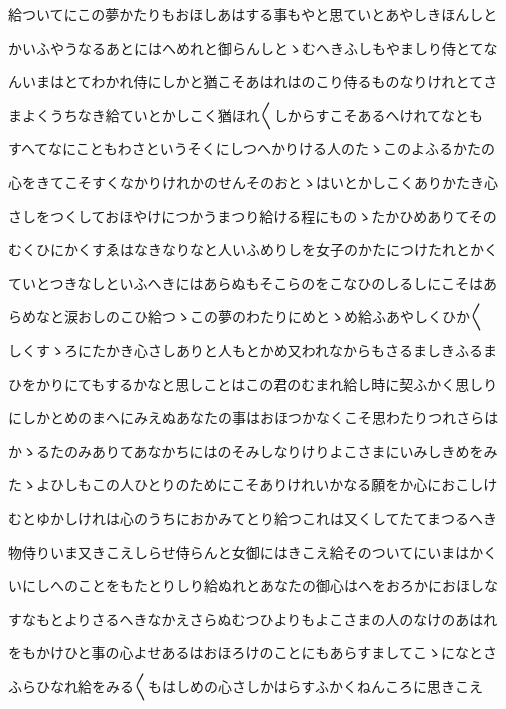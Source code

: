 \documentclass[a4paper,11pt,landscape]{ltjtarticle}
\begin{document}
\par\medskip
給ついてにこの夢かたりもおほしあはする事もやと思ていとあやしきほんしと
\par\medskip
かいふやうなるあとにはへめれと御らんしとゝむへきふしもやましり侍とてな
\par\medskip
んいまはとてわかれ侍にしかと猶こそあはれはのこり侍るものなりけれとてさ
\par\medskip
まよくうちなき給ていとかしこく猶ほれ〱しからすこそあるへけれてなとも
\par\medskip
すへてなにこともわさというそくにしつへかりける人のたゝこのよふるかたの
\par\medskip
心をきてこそすくなかりけれかのせんそのおとゝはいとかしこくありかたき心
\par\medskip
さしをつくしておほやけにつかうまつり給ける程にものゝたかひめありてその
\par\medskip
むくひにかくすゑはなきなりなと人いふめりしを女子のかたにつけたれとかく
\par\medskip
ていとつきなしといふへきにはあらぬもそこらのをこなひのしるしにこそはあ
\par\medskip
らめなと涙おしのこひ給つゝこの夢のわたりにめとゝめ給ふあやしくひか〱
\par\medskip
しくすゝろにたかき心さしありと人もとかめ又われなからもさるましきふるま
\par\medskip
ひをかりにてもするかなと思しことはこの君のむまれ給し時に契ふかく思しり
\par\medskip
にしかとめのまへにみえぬあなたの事はおほつかなくこそ思わたりつれさらは
\par\medskip
かゝるたのみありてあなかちにはのそみしなりけりよこさまにいみしきめをみ
\par\medskip
たゝよひしもこの人ひとりのためにこそありけれいかなる願をか心におこしけ
\par\medskip
むとゆかしけれは心のうちにおかみてとり給つこれは又くしてたてまつるへき
\par\medskip
物侍りいま又きこえしらせ侍らんと女御にはきこえ給そのついてにいまはかく
\par\medskip
いにしへのことをもたとりしり給ぬれとあなたの御心はへをおろかにおほしな
\par\medskip
すなもとよりさるへきなかえさらぬむつひよりもよこさまの人のなけのあはれ
\par\medskip
をもかけひと事の心よせあるはおほろけのことにもあらすましてこゝになとさ
\par\medskip
ふらひなれ給をみる〱もはしめの心さしかはらすふかくねんころに思きこえ
\par\medskip
\end{document}
